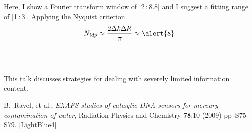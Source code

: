 \documentclass[10pt, xcolor=x11names, compress]{beamer}
\begin{document}
\begin{frame}
\begin{columns}
\begin{column}{0.5\linewidth}
\begin{center}
      \end{center}
    \end{column}
  \end{columns}
  Here, I show a Fourier transform window of [2\,:\,8.8] and I suggest a
  fitting range of [1\,:\,3].  Applying the Nyquist criterion:
  \begin{equation}
    \notag N_{idp} \approx \frac{2\Delta k\Delta R}{\pi} \approx \alert{8}
  \end{equation}

  ~\\[-7ex]
  ~

  \begin{exampleblock}{}
    \begin{center}
      This talk discusses strategies for dealing with severely limited
      information content.
    \end{center}
  \end{exampleblock}

  \begin{bottomnote}[0.7][19.0]%
    B.\ Ravel, et al., \textit{EXAFS studies of catalytic DNA sensors
      for mercury contamination of water}, Radiation Physics and
    Chemistry \textbf{78}:10 (2009) pp\ S75-S79.
    [LightBlue4]
  \end{bottomnote}
\end{frame}
\end{document}
